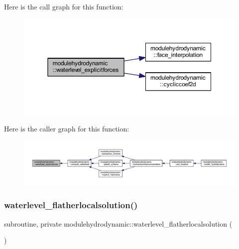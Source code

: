 Here is the call graph for this function\+:\nopagebreak
\begin{figure}[H]
\begin{center}
\leavevmode
\includegraphics[width=350pt]{namespacemodulehydrodynamic_a8f55c0f844c6c92f25d99d0c16b764df_cgraph}
\end{center}
\end{figure}
Here is the caller graph for this function\+:\nopagebreak
\begin{figure}[H]
\begin{center}
\leavevmode
\includegraphics[width=350pt]{namespacemodulehydrodynamic_a8f55c0f844c6c92f25d99d0c16b764df_icgraph}
\end{center}
\end{figure}
\mbox{\label{namespacemodulehydrodynamic_a9e27696e9df4a46aae637e4ecb5bb626}} 
\subsubsection{\texorpdfstring{waterlevel\+\_\+flatherlocalsolution()}{waterlevel\_flatherlocalsolution()}}
{\footnotesize\ttfamily subroutine, private modulehydrodynamic\+::waterlevel\+\_\+flatherlocalsolution (\begin{DoxyParamCaption}{ }\end{DoxyParamCaption})\hspace{0.3cm}{\ttfamily [private]}}

